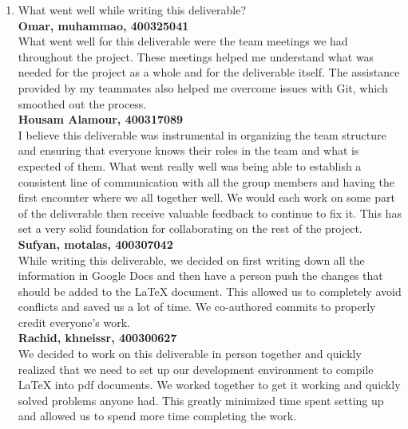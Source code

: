 \documentclass{article}
\begin{document}
\begin{enumerate}
    \item What went well while writing this deliverable? \\
    \textbf{Omar, muhammao, 400325041} \\
    What went well for this deliverable were the team meetings we had throughout the project. These meetings helped me understand what was needed for the project as a whole and for the deliverable itself. The assistance provided by my teammates also helped me overcome issues with Git, which smoothed out the process. \\

    \textbf{Housam Alamour, 400317089} \\
    I believe this deliverable was instrumental in organizing the team structure and ensuring that everyone knows their roles in the team and what is expected of them. What went really well was being able to establish a consistent line of communication with all the group members and having the first encounter where we all together well. We would each work on some part of the deliverable then receive valuable feedback to continue to fix it. This has set a very solid foundation for collaborating on the rest of the project. \\

    \textbf{Sufyan, motalas, 400307042} \\
    While writing this deliverable, we decided on first writing down all the information in Google Docs and then have a person push the changes that should be added to the LaTeX document. This allowed us to completely avoid conflicts and saved us a lot of time. We co-authored commits to properly credit everyone's work. \\

    \textbf{Rachid, khneissr, 400300627} \\
    We decided to work on this deliverable in person together and quickly realized that we need to set up our development environment to compile LaTeX into pdf documents. We worked together to get it working and quickly solved problems anyone had. This greatly minimized time spent setting up and allowed us to spend more time completing the work. \\


\end{enumerate}
\end{document}
